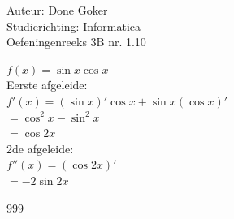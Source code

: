\documentclass[a4paper]{article}
\begin{document}
  
\noindent \large Auteur: Done Goker \\
\noindent \large Studierichting: Informatica\\
\noindent \large Oefeningenreeks 3B nr. 1.10\\

\medskip

\normalsize



$f(x) = \sin x \cos x$ \\


Eerste afgeleide: \\


$f'(x) = (\sin x)' \cos x + \sin x (\cos x)'$ \\

$= \cos ^2 x   - \sin ^2 x $ \\

$= \cos 2x$\\

2de afgeleide:\\


$f''(x) =  ( \cos 2x)'$ \\

$ = - 2\sin 2x$

\begin{thebibliography}{999}
\end{thebibliography}
\end{document}
